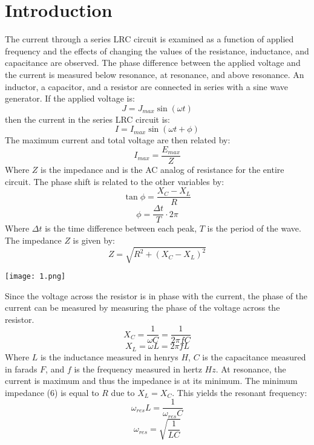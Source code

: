 \documentclass[11pt]{article}
\begin{document}
\section*{Introduction}
The current through a series LRC circuit is examined as a function of applied frequency and the effects of changing the values of the resistance, inductance, and capacitance are observed. The phase difference between the applied voltage and the current is measured below resonance, at resonance, and above resonance. An inductor, a capacitor, and a resistor are connected in series with a sine wave generator. If the applied voltage is:
\begin{equation}
    J=J_{max}\sin(\omega t)
\end{equation}
then the current in the series LRC circuit is:
\begin{equation}
    I=I_{max}\sin(\omega t + \phi)
\end{equation}
The maximum current and total voltage are then related by:
\begin{equation}
    I_{max}=\frac{E_{max}}{Z}
\end{equation}
Where $Z$ is the impedance and is the AC analog of resistance for the entire circuit. The phase shift is related to the other variables by:
\begin{equation}
    \tan\phi=\frac{X_C-X_L}{R}
\end{equation}
\begin{equation}
    \phi=\frac{\Delta t}{T}\cdot 2\pi 
\end{equation}
Where $\Delta t$ is the time difference between each peak, $T$ is the period of the wave. The impedance $Z$ is given by:
\begin{equation}
    Z=\sqrt{R^2+(X_C-X_L)^2}
\end{equation}
\begin{center}
    \texttt{[image: 1.png]}
\end{center}
Since the voltage across the resistor is in phase with the current, the phase of the current can be measured by measuring the phase of the voltage across the resistor.
\begin{equation}
    X_C=\frac{1}{\omega C}=\frac{1}{2\pi fC}
\end{equation}
\begin{equation}
    X_L=\omega L=2\pi fL
\end{equation}
Where $L$ is the inductance measured in henrys $H$, $C$ is the capacitance measured in farads $F$, and $f$ is the frequency measured in hertz $Hz$. At resonance, the current is maximum and thus the impedance is at its minimum. The minimum impedance (6) is equal to $R$ due to $X_L=X_C$. This yields the resonant frequency:
\begin{equation}
    \omega_{res}L=\frac{1}{\omega_{res}C}
\end{equation}
\begin{equation}
    \omega_{res}=\sqrt{\frac{1}{LC}}
\end{equation}
\end{document}
